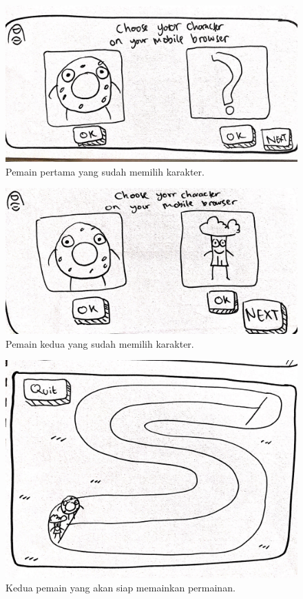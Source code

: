 \documentclass[a4paper,twoside]{article}
\begin{document}
\begin{enumerate}
		\begin{figure}[H]
			\centering
			\includegraphics[scale=0.1]{Gambar/web6_char2}
			\caption{Pemain pertama yang sudah memilih karakter.}
			\label{fig:6_web6_char2}
		\end{figure}
	
		\begin{figure}[H]
			\centering
			\includegraphics[scale=0.1]{Gambar/web7_char3}
			\caption{Pemain kedua yang sudah memilih karakter.}
			\label{fig:7_web7_char3}
		\end{figure}
	
		\begin{figure}[H]
			\centering
			\includegraphics[scale=0.1]{Gambar/web8_run1}
			\caption{Kedua pemain yang akan siap memainkan permainan.}
			\label{fig:8_web8_run1}
		\end{figure}
	

\end{enumerate}
\end{document}

